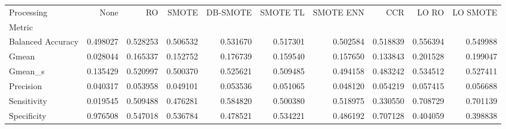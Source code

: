 \begin{tabular}{lrrrrrrrrr}
\toprule
Processing &      None &        RO &     SMOTE &  DB-SMOTE &  SMOTE TL &  SMOTE ENN &       CCR &     LO RO &  LO SMOTE \\
Metric            &           &           &           &           &           &            &           &           &           \\
\midrule
Balanced Accuracy &  0.498027 &  0.528253 &  0.506532 &  0.531670 &  0.517301 &   0.502584 &  0.518839 &  0.556394 &  0.549988 \\
Gmean             &  0.028044 &  0.165337 &  0.152752 &  0.176739 &  0.159540 &   0.157650 &  0.133843 &  0.201528 &  0.199047 \\
Gmean_s           &  0.135429 &  0.520997 &  0.500370 &  0.525621 &  0.509485 &   0.494158 &  0.483242 &  0.534512 &  0.527411 \\
Precision         &  0.040317 &  0.053958 &  0.049101 &  0.053536 &  0.051065 &   0.048120 &  0.054219 &  0.057415 &  0.056688 \\
Sensitivity       &  0.019545 &  0.509488 &  0.476281 &  0.584820 &  0.500380 &   0.518975 &  0.330550 &  0.708729 &  0.701139 \\
Specificity       &  0.976508 &  0.547018 &  0.536784 &  0.478521 &  0.534221 &   0.486192 &  0.707128 &  0.404059 &  0.398838 \\
\bottomrule
\end{tabular}
